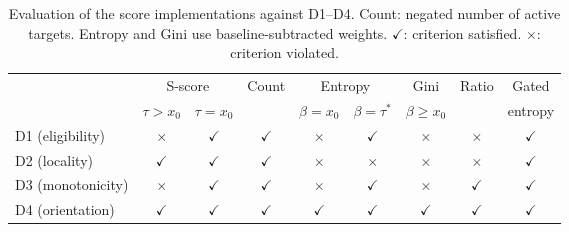 \documentclass{article}
\begin{document}
\setcounter{table}{3}
\begin{table}[h]
  \centering
  \caption{Evaluation of the score implementations against D1--D4.
           Count: negated number of active targets. Entropy and Gini use
           baseline-subtracted weights. $\checkmark$: criterion satisfied.
           $\times$: criterion violated.}
  \label{tab:desiderata}
  \small
  \setlength{\tabcolsep}{3.5pt}
  \begin{tabular}{lcccccccc}
    \toprule
    & \multicolumn{2}{c}{S-score} & Count & \multicolumn{2}{c}{Entropy} & Gini & Ratio & Gated \\
    \cmidrule(lr){2-3}\cmidrule(lr){5-6}
    & $\tau > x_0$ & $\tau = x_0$ & & $\beta = x_0$ & $\beta = \tau^*$ & $\beta \geq x_0$ & & entropy \\
    \midrule
    D1 (eligibility)   & $\times$ & $\checkmark$ & $\checkmark$ & $\times$ & $\checkmark$ & $\times$ & $\times$     & $\checkmark$ \\
    D2 (locality)      & $\checkmark$ & $\checkmark$ & $\checkmark$ & $\times$ & $\times$ & $\times$ & $\times$     & $\checkmark$ \\
    D3 (monotonicity)  & $\times$ & $\checkmark$ & $\checkmark$ & $\times$ & $\checkmark$ & $\times$ & $\checkmark$ & $\checkmark$ \\
    D4 (orientation)   & $\checkmark$ & $\checkmark$ & $\checkmark$ & $\checkmark$ & $\checkmark$ & $\checkmark$ & $\checkmark$ & $\checkmark$ \\
    \bottomrule
  \end{tabular}
\end{table}
\end{document}
